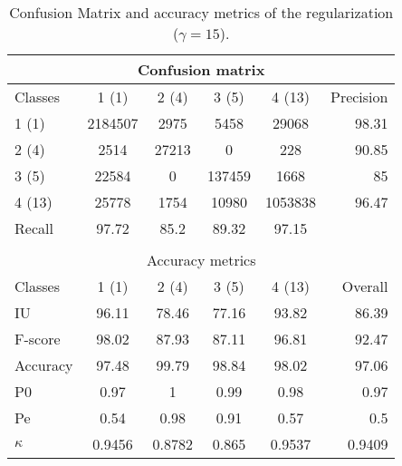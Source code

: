 \begin{table}[H]
\begin{center}
\footnotesize
\begin{tabular}{|l|c|c|c|c|r|}
\hline
\multicolumn{6}{|c|}{Confusion matrix} \\
\hline
 Classes & 1 (1) & 2 (4) & 3 (5) & 4 (13) & Precision \\
\hline
1 (1) & 2184507 & 2975 & 5458 & 29068 & 98.31 \\
\hline
2 (4) & 2514 & 27213 & 0 & 228 & 90.85 \\
\hline
3 (5) & 22584 & 0 & 137459 & 1668 & 85 \\
\hline
4 (13) & 25778 & 1754 & 10980 & 1053838 & 96.47 \\
\hline
Recall & 97.72 & 85.2 & 89.32 & 97.15 &  \\
\hline
\multicolumn{6}{c}{ } \\
\hline
\multicolumn{6}{|c|}{Accuracy metrics} \\
\hline
 Classes & 1 (1) & 2 (4) & 3 (5) & 4 (13) & Overall \\
\hline
IU & 96.11 & 78.46 & 77.16 & 93.82 & 86.39 \\
\hline
F-score & 98.02 & 87.93 & 87.11 & 96.81 & 92.47 \\
\hline
Accuracy & 97.48 & 99.79 & 98.84 & 98.02 & 97.06 \\
\hline
P0 & 0.97 & 1 & 0.99 & 0.98 & 0.97 \\
\hline
Pe & 0.54 & 0.98 & 0.91 & 0.57 & 0.5 \\
\hline
$\kappa$ & 0.9456 & 0.8782 & 0.865 & 0.9537 & 0.9409 \\
\hline
\end{tabular}
\caption{Confusion Matrix and accuracy metrics of the regularization ($\gamma=15$).}
\label{table:}
\end{center}
\end{table}
